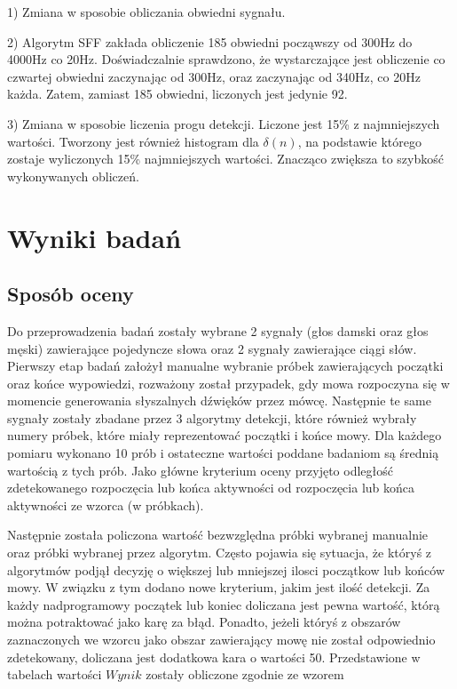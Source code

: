 \documentclass[eng,printmode]{mgr}
\begin{document}
1) Zmiana w sposobie obliczania obwiedni sygnału.\vspace{5mm}

2) Algorytm SFF zakłada obliczenie 185 obwiedni począwszy od 300Hz do 4000Hz co 20Hz. Doświadczalnie sprawdzono, że wystarczające jest obliczenie co czwartej obwiedni zaczynając od 300Hz, oraz zaczynając od 340Hz, co 20Hz każda. Zatem, zamiast 185 obwiedni, liczonych jest jedynie 92. \vspace{5mm}

3) Zmiana w sposobie liczenia progu detekcji. Liczone jest 15\% z najmniejszych wartości. Tworzony jest również histogram dla $\delta(n)$, na podstawie którego zostaje wyliczonych 15\% najmniejszych wartości. Znacząco zwiększa to szybkość wykonywanych obliczeń.\vspace{5mm}


\chapter{Wyniki badań}
\section{Sposób oceny}
	Do przeprowadzenia badań zostały wybrane 2 sygnały (głos damski oraz głos męski) zawierające pojedyncze słowa oraz 2 sygnały zawierające ciągi słów. Pierwszy etap badań założył manualne wybranie próbek zawierających początki oraz końce wypowiedzi, rozważony został przypadek, gdy mowa rozpoczyna się w momencie generowania słyszalnych dźwięków przez mówcę.
	Następnie te same sygnały zostały zbadane przez 3 algorytmy detekcji, które również wybrały numery próbek, które miały reprezentować początki i końce mowy. Dla każdego pomiaru wykonano 10 prób i ostateczne wartości poddane badaniom są średnią wartością z tych prób. Jako główne kryterium oceny przyjęto odległość zdetekowanego rozpoczęcia lub końca aktywności od rozpoczęcia lub końca aktywności ze wzorca (w próbkach). 
		
 Następnie została policzona wartość bezwzględna próbki wybranej manualnie oraz próbki wybranej przez algorytm. Często pojawia się sytuacja, że któryś z algorytmów podjął decyzję o większej lub mniejszej ilosci początkow lub końców mowy. W związku z tym dodano nowe kryterium, jakim jest ilość detekcji. Za każdy nadprogramowy początek lub koniec doliczana jest pewna wartość, którą można potraktować jako karę za błąd. Ponadto, jeżeli któryś z obszarów zaznaczonych we wzorcu jako obszar zawierający mowę nie został odpowiednio zdetekowany, doliczana jest dodatkowa kara o wartości 50. Przedstawione w tabelach wartości $Wynik$ zostały obliczone zgodnie ze wzorem 
 
\end{document}
